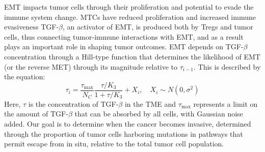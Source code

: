 \documentclass[11pt]{article}
\begin{document}
\begin{framed}
\newline
EMT impacts tumor cells through their proliferation and potential to evade the immune system change. MTCs have reduced proliferation %
and increased immune evasiveness %
TGF-$\beta$, an activator of EMT, is produced both by Tregs and tumor cells, thus connecting tumor-immune interactions with EMT, and as a result plays an important role in shaping tumor outcomes. EMT depends on TGF-$\beta$ concentration through a Hill-type function that determines the likelihood of EMT (or the reverse MET) through its magnitude relative to $\tau_{i-1}$. This is described by the equation:
    $$
    \tau_i = \frac{\tau_{\text{max}}}{N_C}\frac{\tau/K_3}{1+\tau/K_3} + X_i, \quad X_i \sim N(0,\sigma^2)
    $$
    Here, $\tau$ is the concentration of TGF-$\beta$ in the TME and $\tau_\text{max}$ represents a limit on the amount of TGF-$\beta$ that can be absorbed by all cells, with Gaussian noise added.
    \newline
    Our goal is to determine when the cancer becomes invasive, determined through the proportion of tumor cells harboring mutations in pathways that permit escape from in situ, relative to the total tumor cell population.
  \end{framed}





\end{document}
